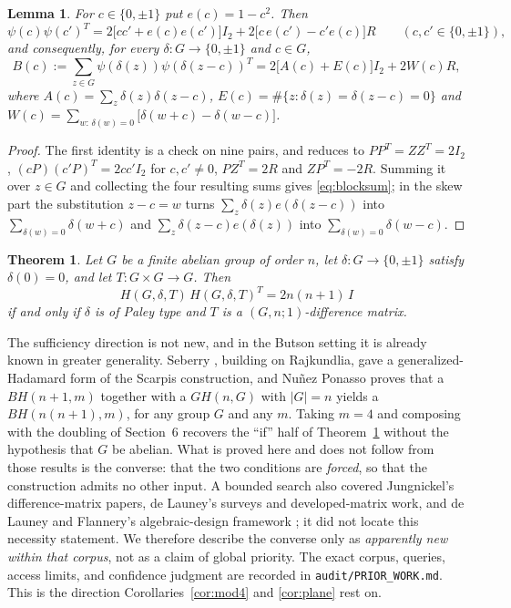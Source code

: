 \documentclass[11pt]{article}
\newtheorem{theorem}{Theorem}
\newtheorem{lemma}{Lemma}
\newcommand{\I}{I}
\begin{document}
\begin{lemma}\label{lem:pair}
For \(c\in\{0,\pm1\}\) put \(e(c)=1-c^{2}\).  Then
\[
        \psi(c)\psi(c')^{T}
        =2\bigl[cc'+e(c)e(c')\bigr]\I_2
         +2\bigl[c\,e(c')-c'e(c)\bigr]R
        \qquad(c,c'\in\{0,\pm1\}),
\]
and consequently, for every \(\delta\colon G\to\{0,\pm1\}\) and \(c\in G\),
\[
        B(c):=\sum_{z\in G}\psi(\delta(z))\psi(\delta(z-c))^{T}
        =2\bigl[A(c)+E(c)\bigr]\I_2+2W(c)R,
        \tag{5.1}\label{eq:blocksum}
\]
where \(A(c)=\sum_{z}\delta(z)\delta(z-c)\),
\(E(c)=\#\{z:\delta(z)=\delta(z-c)=0\}\) and
\(W(c)=\sum_{w:\,\delta(w)=0}\bigl[\delta(w+c)-\delta(w-c)\bigr]\).
\end{lemma}

\begin{proof}
The first identity is a check on nine pairs, and reduces to
\(PP^{T}=ZZ^{T}=2\I_2\), \((cP)(c'P)^{T}=2cc'\I_2\) for \(c,c'\neq0\),
\(PZ^{T}=2R\) and \(ZP^{T}=-2R\).  Summing it over \(z\in G\) and collecting
the four resulting sums gives \eqref{eq:blocksum}; in the skew part the
substitution \(z-c=w\) turns \(\sum_z\delta(z)e(\delta(z-c))\) into
\(\sum_{\delta(w)=0}\delta(w+c)\) and \(\sum_z\delta(z-c)e(\delta(z))\) into
\(\sum_{\delta(w)=0}\delta(w-c)\).
\end{proof}

\begin{theorem}\label{thm:char}
Let \(G\) be a finite abelian group of order \(n\), let
\(\delta\colon G\to\{0,\pm1\}\) satisfy \(\delta(0)=0\), and let
\(T\colon G\times G\to G\).  Then
\[
        H(G,\delta,T)\,H(G,\delta,T)^{T}=2n(n+1)\,\I
\]
if and only if \(\delta\) is of Paley type and \(T\) is a
\((G,n;1)\)-difference matrix.
\end{theorem}

The sufficiency direction is not new, and in the Butson setting it is
already known in greater generality.  Seberry \cite{Seberry1980}, building
on Rajkundlia, gave a generalized-Hadamard form of the Scarpis
construction, and Nu\~nez Ponasso \cite[Thm.~4.3.3]{Ponasso2024} proves
that a \(BH(n+1,m)\) together with a \(GH(n,G)\) with \(|G|=n\) yields a
\(BH(n(n+1),m)\), for any group \(G\) and any \(m\).  Taking \(m=4\) and
composing with the doubling of Section~6 recovers the ``if'' half of
Theorem~\ref{thm:char} without the hypothesis that \(G\) be abelian.  What
is proved here and does not follow from those results is the converse:
that the two conditions are \emph{forced}, so that the construction admits
no other input.  A bounded search also covered Jungnickel's difference-matrix
papers, de Launey's surveys and developed-matrix work, and de Launey and
Flannery's algebraic-design framework
\cite{Jungnickel1979,Jungnickel1980,deLauney1986,deLauney1992,
deLauneyFlannery2011,ColbournDinitz2007}; it did not locate this necessity
statement.  We therefore describe the converse only as \emph{apparently new
within that corpus}, not as a claim of global priority.  The exact corpus,
queries, access limits, and confidence judgment are recorded in
\texttt{audit/PRIOR\_WORK.md}.  This is the direction
Corollaries~\ref{cor:mod4} and \ref{cor:plane} rest on.
\end{document}

